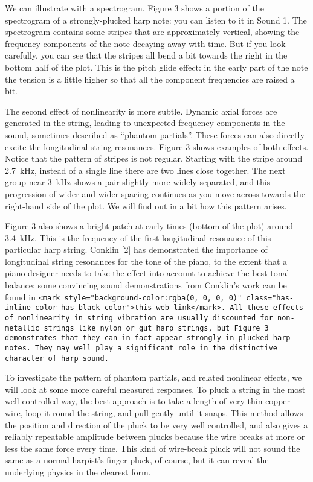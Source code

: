   We can illustrate with a spectrogram. Figure 3 shows a portion of the 
  spectrogram of a strongly-plucked harp note: you can listen to it in Sound 1. 
  The spectrogram contains some stripes that are approximately vertical, 
  showing the frequency components of the note decaying away with time. But if 
  you look carefully, you can see that the stripes all bend a bit towards the 
  right in the bottom half of the plot. This is the pitch glide effect: in the 
  early part of the note the tension is a little higher so that all the 
  component frequencies are raised a bit. 

  The second effect of nonlinearity is more subtle. Dynamic axial forces are 
  generated in the string, leading to unexpected frequency components in the 
  sound, sometimes described as “phantom partials”. These forces can also 
  directly excite the longitudinal string resonances. Figure 3 shows examples 
  of both effects. Notice that the pattern of stripes is not regular. Starting 
  with the stripe around 2.7~kHz, instead of a single line there are two lines 
  close together. The next group near 3~kHz shows a pair slightly more widely 
  separated, and this progression of wider and wider spacing continues as you 
  move across towards the right-hand side of the plot. We will find out in a 
  bit how this pattern arises. 

  Figure 3 also shows a bright patch at early times (bottom of the plot) around 
  3.4 kHz. This is the frequency of the first longitudinal resonance of this 
  particular harp string. Conklin [2] has demonstrated the importance of 
  longitudinal string resonances for the tone of the piano, to the extent that 
  a piano designer needs to take the effect into account to achieve the best 
  tonal balance: some convincing sound demonstrations from Conklin's work can 
  be found in \tt{}<mark style="background-color:rgba(0, 0, 0, 0)" 
  class="has-inline-color has-black-color">this web link</mark>\rm{}. All these 
  effects of nonlinearity in string vibration are usually discounted for 
  non-metallic strings like nylon or gut harp strings, but Figure 3 
  demonstrates that they can in fact appear strongly in plucked harp notes. 
  They may well play a significant role in the distinctive character of harp 
  sound. 

  To investigate the pattern of phantom partials, and related nonlinear 
  effects, we will look at some more careful measured responses. To pluck a 
  string in the most well-controlled way, the best approach is to take a length 
  of very thin copper wire, loop it round the string, and pull gently until it 
  snaps. This method allows the position and direction of the pluck to be very 
  well controlled, and also gives a reliably repeatable amplitude between 
  plucks because the wire breaks at more or less the same force every time. 
  This kind of wire-break pluck will not sound the same as a normal harpist’s 
  finger pluck, of course, but it can reveal the underlying physics in the 
  clearest form. 

